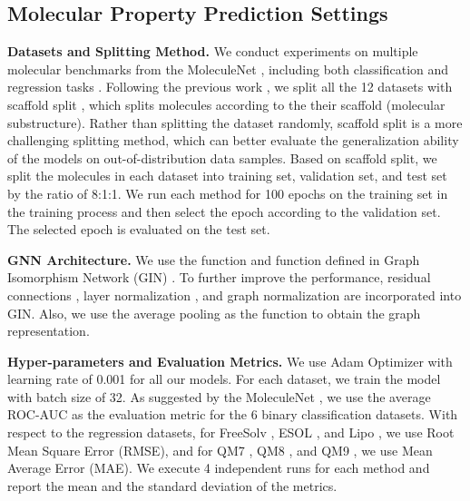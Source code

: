 \documentclass{article}
\begin{document}
\subsection{Molecular Property Prediction Settings}
\textbf{Datasets and Splitting Method.}
We conduct experiments on multiple molecular benchmarks from the MoleculeNet \cite{DBLP:journals/corr/WuRFGGPLP17}, including both classification and regression tasks \cite{subramanian2016computational,DBLP:journals/jcisd/MartinsTPF12,richard2016toxcast,gayvert2016data,huang2017editorial,DBLP:journals/nar/KuhnLJB16}. Following the previous work \cite{DBLP:conf/iclr/HuLGZLPL20}, we split all the 12 datasets with scaffold split \cite{ramsundar2019deep}, which splits molecules according to the their scaffold (molecular substructure). Rather than splitting the dataset randomly, scaffold split is a more challenging splitting method, which can better evaluate the generalization ability of the models on out-of-distribution data samples. Based on scaffold split, we split the molecules in each dataset into training set, validation set, and test set by the ratio of 8:1:1. We run each method for 100 epochs on the training set in the training process and then select the epoch according to the validation set. The selected epoch is evaluated on the test set.





\textbf{GNN Architecture.}
We use the  function and  function defined in Graph Isomorphism Network (GIN) \cite{DBLP:conf/iclr/XuHLJ19}. To further improve the performance, residual connections \cite{DBLP:conf/cvpr/HeZRS16}, layer normalization \cite{DBLP:journals/corr/BaKH16}, and graph normalization \cite{DBLP:journals/corr/abs-2009-11746} are incorporated into GIN. Also, we use the average pooling as the  function to obtain the graph representation.

\textbf{Hyper-parameters and Evaluation Metrics.}
We use Adam Optimizer\cite{DBLP:journals/corr/KingmaB14} with learning rate of 0.001 for all our models. For each dataset, we train the model with batch size of 32. As suggested by the MoleculeNet \cite{DBLP:journals/corr/WuRFGGPLP17},  we use the average ROC-AUC \cite{DBLP:journals/pr/Bradley97} as the evaluation metric for the 6 binary classification datasets. With respect to the regression datasets, for FreeSolv \cite{DBLP:journals/jcamd/MobleyG14}, ESOL \cite{DBLP:journals/jcisd/Delaney04}, and Lipo \cite{DBLP:journals/nar/GaultonBBCDHLMMAO12}, we use Root Mean Square Error (RMSE), and for QM7 \cite{blum2009970}, QM8 \cite{ramakrishnan2015electronic}, and QM9 \cite{DBLP:journals/jcisd/RuddigkeitDBR12}, we use Mean Average Error (MAE). We execute 4 independent runs for each method and report the mean and the standard deviation of the metrics.
\end{document}
